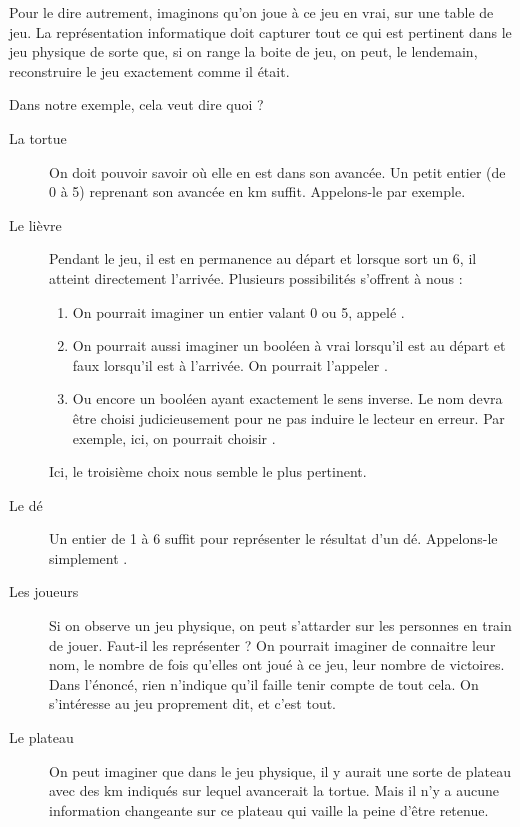 			Pour le dire autrement, 
			imaginons qu'on joue à ce jeu \og{}en vrai\fg{}, sur une table de jeu.
			La représentation informatique doit capturer tout ce qui est pertinent
			dans le jeu physique de sorte que, si on range la boite de jeu,
			on peut, le lendemain, reconstruire le jeu exactement comme il était.
			
			Dans notre exemple, cela veut dire quoi ?
			\begin{description}
			\item[La tortue]
				On doit pouvoir savoir où elle en est dans son avancée.
				Un petit entier (de 0 à 5) reprenant son avancée en km suffit.
				Appelons-le  par exemple.
			\item[Le lièvre]
				Pendant le jeu, il est en permanence au départ
				et lorsque sort un 6, il atteint directement l'arrivée.
				Plusieurs possibilités s'offrent à nous :
			
				\begin{enumerate}
				\item
					On pourrait imaginer un entier valant 0 ou 5,
					appelé .
				\item
					On pourrait aussi imaginer un booléen à vrai 
					lorsqu'il est au départ et faux lorsqu'il est à l'arrivée.
					On pourrait l'appeler .
				\item
					Ou encore un booléen ayant exactement le sens inverse.
					Le nom devra être choisi judicieusement pour ne pas induire
					le lecteur en erreur.
					Par exemple, ici, on pourrait choisir .
				\end{enumerate}
				
				Ici, le troisième choix nous semble le plus pertinent.
			\item[Le dé]
				Un entier de 1 à 6 suffit pour représenter le résultat d'un dé.
				Appelons-le simplement .
			\item[Les joueurs]
				Si on observe un jeu physique,
				on peut s'attarder sur les personnes en train de jouer.
				Faut-il les représenter ?
				On pourrait imaginer de connaitre leur nom,
				le nombre de fois qu'elles ont joué à ce jeu,
				leur nombre de victoires.
				Dans l'énoncé, 
				rien n'indique qu'il faille tenir compte de tout cela. 
				On s'intéresse au jeu proprement dit, et c'est tout.
			\item[Le plateau]
				On peut imaginer que dans le jeu physique,
				il y aurait une sorte de plateau 
				avec des km indiqués
				sur lequel avancerait la tortue.
				Mais il n'y a aucune information changeante
				sur ce plateau qui vaille la peine d'être retenue.
			\end{description}

